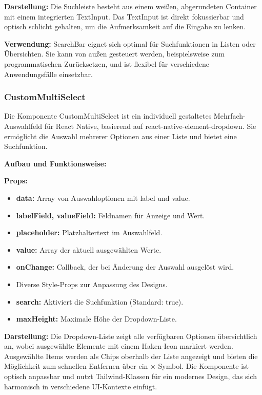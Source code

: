\documentclass[12pt, a4paper]{report} %
\begin{document}
\textbf{Darstellung:}
Die Suchleiste besteht aus einem weißen, abgerundeten Container mit einem integrierten TextInput. Das TextInput ist direkt fokussierbar und optisch schlicht gehalten, um die Aufmerksamkeit auf die Eingabe zu lenken.

\noindent\textbf{Verwendung:} SearchBar eignet sich optimal für Suchfunktionen in Listen oder Übersichten. Sie kann von außen gesteuert werden, beispielsweise zum programmatischen Zurücksetzen, und ist flexibel für verschiedene Anwendungsfälle einsetzbar.

\subsubsection{CustomMultiSelect}
Die Komponente CustomMultiSelect ist ein individuell gestaltetes Mehrfach-Auswahlfeld für React Native, basierend auf react-native-element-dropdown. Sie ermöglicht die Auswahl mehrerer Optionen aus einer Liste und bietet eine Suchfunktion.

\noindent\textbf{Aufbau und Funktionsweise:}

\textbf{Props:}
\begin{itemize}
    \item \textbf{data:} Array von Auswahloptionen mit label und value.
    \item \textbf{labelField, valueField:} Feldnamen für Anzeige und Wert.
    \item \textbf{placeholder:} Platzhaltertext im Auswahlfeld.
    \item \textbf{value:} Array der aktuell ausgewählten Werte.
    \item \textbf{onChange:} Callback, der bei Änderung der Auswahl ausgelöst wird.
    \item Diverse Style-Props zur Anpassung des Designs.
    \item \textbf{search:} Aktiviert die Suchfunktion (Standard: true).
    \item \textbf{maxHeight:} Maximale Höhe der Dropdown-Liste.
\end{itemize}

\textbf{Darstellung:}
Die Dropdown-Liste zeigt alle verfügbaren Optionen übersichtlich an, wobei ausgewählte Elemente mit einem Haken-Icon markiert werden. Ausgewählte Items werden als Chips oberhalb der Liste angezeigt und bieten die Möglichkeit zum schnellen Entfernen über ein ×-Symbol. Die Komponente ist optisch anpassbar und nutzt Tailwind-Klassen für ein modernes Design, das sich harmonisch in verschiedene UI-Kontexte einfügt.
\end{document}
